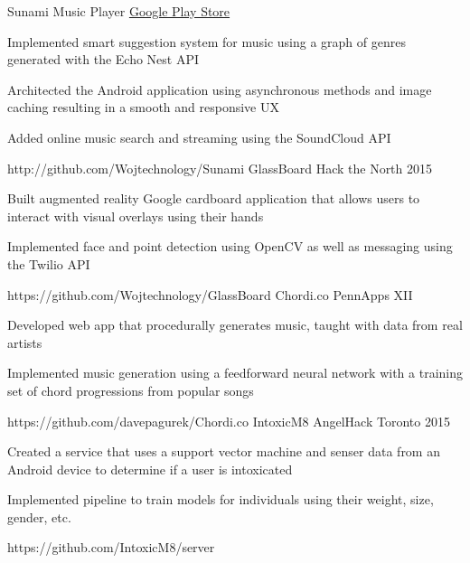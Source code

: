\begin{cvprojects}
  \cvproject
    {Sunami Music Player}
    {\href{http://play.google.com/store/apps/details?id=com.wojtechnology.sunami}{Google Play Store}}
    {
      \begin{cvitems}
        \item Implemented smart suggestion system for music using a graph of genres generated with the Echo Nest API
        \item Architected the Android application using asynchronous methods and image caching resulting in a smooth and responsive UX
        \item Added online music search and streaming using the SoundCloud API
      \end{cvitems}
    }
    {http://github.com/Wojtechnology/Sunami}
  \cvproject
    {GlassBoard}
    {Hack the North 2015}
    {
      \begin{cvitems}
        \item Built augmented reality Google cardboard application that allows users to interact with visual overlays using their hands
        \item Implemented face and point detection using OpenCV as well as messaging using the Twilio API
      \end{cvitems}
    }
    {https://github.com/Wojtechnology/GlassBoard}
  \cvproject
    {Chordi.co}
    {PennApps XII}
    {
      \begin{cvitems}
        \item Developed web app that procedurally generates music, taught with data from real artists
        \item Implemented music generation using a feedforward neural network with a training set of chord progressions from popular songs
      \end{cvitems}
    }
    {https://github.com/davepagurek/Chordi.co}
  \cvproject
    {IntoxicM8}
    {AngelHack Toronto 2015}
    {
      \begin{cvitems}
        \item Created a service that uses a support vector machine and senser data from an Android device to determine if a user is intoxicated
        \item Implemented pipeline to train models for individuals using their weight, size, gender, etc.
      \end{cvitems}
    }
    {https://github.com/IntoxicM8/server}
\end{cvprojects}
